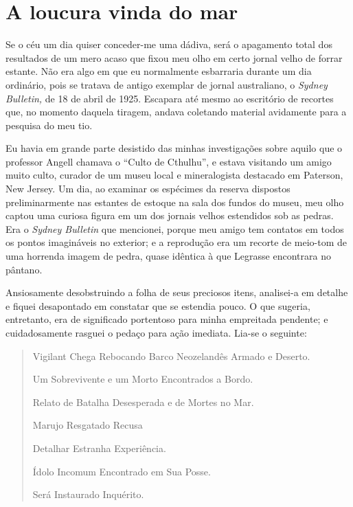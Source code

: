 {\let\clearpage\relax\chapter[A loucura vinda do mar \medskip]{A loucura vinda do mar}}

\noindent{}Se o céu um dia quiser conceder-me uma dádiva, será o apagamento total
dos resultados de um mero acaso que fixou meu olho em certo jornal velho
de forrar estante. Não era algo em que eu normalmente esbarraria durante
um dia ordinário, pois se tratava de antigo exemplar de jornal
australiano, o \emph{Sydney Bulletin,} de 18 de abril de 1925. Escapara
até mesmo ao escritório de recortes que, no momento daquela tiragem,
andava coletando material avidamente para a pesquisa do meu tio.

Eu havia em grande parte desistido das minhas investigações sobre aquilo
que o professor Angell chamava o ``Culto de Cthulhu'', e estava
visitando um amigo muito culto, curador de um museu local e
mineralogista destacado em Paterson, New Jersey. Um dia, ao examinar os
espécimes da reserva dispostos preliminarmente nas estantes de estoque
na sala dos fundos do museu, meu olho captou uma curiosa figura em um
dos jornais velhos estendidos sob as pedras. Era o \emph{Sydney
Bulletin} que mencionei, porque meu amigo tem contatos em todos os
pontos imagináveis no exterior; e a reprodução era um recorte de
meio-tom de uma horrenda imagem de pedra, quase idêntica à que Legrasse
encontrara no pântano.

Ansiosamente desobstruindo a folha de seus preciosos itens, analisei-a
em detalhe e fiquei desapontado em constatar que se estendia pouco. O
que sugeria, entretanto, era de significado portentoso para minha
empreitada pendente; e cuidadosamente rasguei o pedaço para ação
imediata. Lia-se o seguinte:

\begin{quote}

Vigilant Chega Rebocando Barco Neozelandês Armado e Deserto.

Um Sobrevivente e um Morto Encontrados a Bordo.

Relato de Batalha Desesperada e de Mortes no Mar.

Marujo Resgatado Recusa

Detalhar Estranha Experiência.

Ídolo Incomum Encontrado em Sua Posse.

Será Instaurado Inquérito.
\end{quote}

